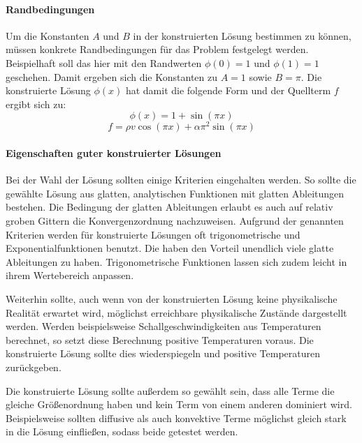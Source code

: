 \paragraph{Randbedingungen}

Um die Konstanten $A$ und $B$ in der konstruierten Lösung bestimmen zu können,
müssen konkrete Randbedingungen für das Problem festgelegt werden. Beispielhaft
soll das hier mit den Randwerten $\phi(0) = 1$ und $\phi(1) = 1$ geschehen.
Damit ergeben sich die Konstanten zu $A = 1$ sowie $B = \pi$. Die 
konstruierte Lösung $\phi(x)$ hat damit die folgende Form und der Quellterm $f$
ergibt sich zu:
\begin{equation*}
  \phi(x) = 1 + \sin(\pi x)
\end{equation*}
\begin{equation*}
  f=\rho v \cos(\pi x) + \alpha \pi^2 \sin(\pi x)
  \label{eq:quellterm}
\end{equation*}


\paragraph{Eigenschaften guter konstruierter Lösungen}

Bei der Wahl der Lösung sollten einige Kriterien eingehalten werden. So sollte die gewählte Lösung
aus glatten, analytischen Funktionen mit glatten Ableitungen bestehen. Die Bedingung der glatten Ableitungen
erlaubt es auch auf relativ groben Gittern die Konvergenzordnung nachzuweisen.
Aufgrund der genannten Kriterien werden für konstruierte Lösungen oft trigonometrische und Exponentialfunktionen benutzt.
Die haben den Vorteil unendlich viele glatte Ableitungen zu haben. Trigonometrische Funktionen lassen
sich zudem leicht in ihrem Wertebereich anpassen.

Weiterhin sollte, auch wenn von der konstruierten Lösung keine physikalische Realität erwartet wird, möglichst
erreichbare physikalische Zustände dargestellt werden. Werden beispielsweise Schallgeschwindigkeiten
aus Temperaturen berechnet, so setzt diese Berechnung positive Temperaturen voraus. Die konstruierte Lösung sollte dies wiederspiegeln
und positive Temperaturen zurückgeben.

Die konstruierte Lösung sollte außerdem so gewählt sein, dass alle Terme die gleiche Größenordnung haben
und kein Term von einem anderen dominiert wird. Beispielsweise sollten diffusive als auch konvektive Terme
möglichst gleich stark in die Lösung einfließen, sodass beide getestet werden.

